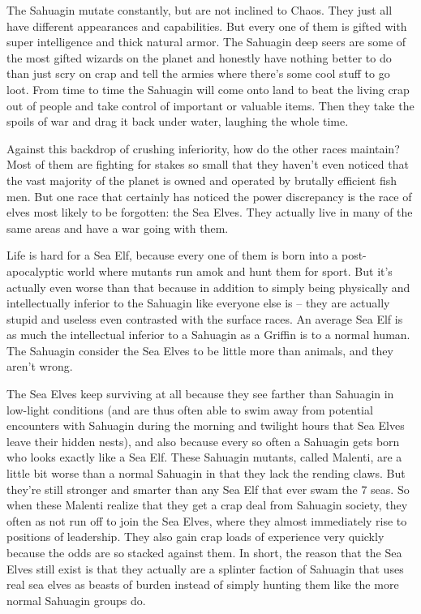 The Sahuagin mutate constantly, but are not inclined to Chaos. They just all have different appearances and capabilities. But every one of them is gifted with super intelligence and thick natural armor. The Sahuagin deep seers are some of the most gifted wizards on the planet and honestly have nothing better to do than just scry on crap and tell the armies where there's some cool stuff to go loot. From time to time the Sahuagin will come onto land to beat the living crap out of people and take control of important or valuable items. Then they take the spoils of war and drag it back under water, laughing the whole time.

Against this backdrop of crushing inferiority, how do the other races maintain? Most of them are fighting for stakes so small that they haven't even noticed that the vast majority of the planet is owned and operated by brutally efficient fish men. But one race that certainly has noticed the power discrepancy is the race of elves most likely to be forgotten: the Sea Elves. They actually live in many of the same areas and have a war going with them.

Life is hard for a Sea Elf, because every one of them is born into a post-apocalyptic world where mutants run amok and hunt them for sport. But it's actually even worse than that because in addition to simply being physically and intellectually inferior to the Sahuagin like everyone else is -- they are actually stupid and useless even contrasted with the surface races. An average Sea Elf is as much the intellectual inferior to a Sahuagin as a Griffin is to a normal human. The Sahuagin consider the Sea Elves to be little more than animals, and they aren't wrong.

The Sea Elves keep surviving at all because they see farther than Sahuagin in low-light conditions (and are thus often able to swim away from potential encounters with Sahuagin during the morning and twilight hours that Sea Elves leave their hidden nests), and also because every so often a Sahuagin gets born who looks exactly like a Sea Elf. These Sahuagin mutants, called Malenti, are a little bit worse than a normal Sahuagin in that they lack the rending claws. But they're still stronger and smarter than any Sea Elf that ever swam the 7 seas. So when these Malenti realize that they get a crap deal from Sahuagin society, they often as not run off to join the Sea Elves, where they almost immediately rise to positions of leadership. They also gain crap loads of experience very quickly because the odds are so stacked against them. In short, the reason that the Sea Elves still exist is that they actually are a splinter faction of Sahuagin that uses real sea elves as beasts of burden instead of simply hunting them like the more normal Sahuagin groups do.

